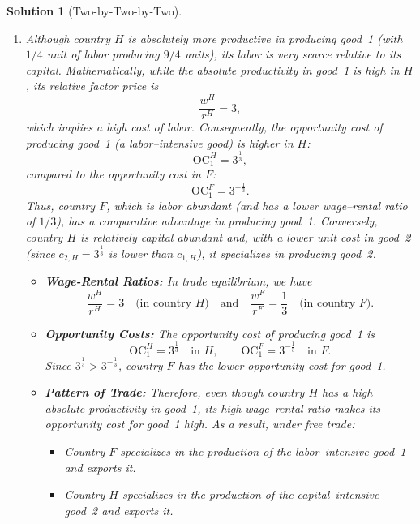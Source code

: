 \documentclass[a4paper,12pt]{article} %
\theoremstyle{nonitalic}
\newtheorem{solution}{Solution}
\begin{document}
\begin{solution}[Two-by-Two-by-Two]
\begin{enumerate}
        \item[7.] Although country $H$ is absolutely more productive in producing good~1 (with $1/4$ unit of labor producing $9/4$ units), its labor is very scarce relative to its capital. 
            Mathematically, while the \emph{absolute productivity} in good~1 is high in $H$, its \emph{relative factor price} is
            \[
            \frac{w^H}{r^H} = 3,
            \]
            which implies a high cost of labor. Consequently, the \emph{opportunity cost} of producing good~1 (a labor--intensive good) is higher in $H$:
            \[
            \text{OC}_1^H = 3^{\frac{1}{3}},
            \]
            compared to the opportunity cost in $F$:
            \[
            \text{OC}_1^F = 3^{-\frac{1}{3}}.
            \]
            Thus, country $F$, which is labor abundant (and has a lower wage–rental ratio of $1/3$), has a comparative advantage in producing good~1. Conversely, country $H$ is relatively capital abundant and, with a lower unit cost in good~2 (since $c_{2,H} = 3^{\frac{1}{3}}$ is lower than $c_{1,H}$), it specializes in producing good~2.
            \begin{itemize}
                \item \textbf{Wage-Rental Ratios:} In trade equilibrium, we have
                \[
                \frac{w^H}{r^H} = 3 \quad \text{(in country } H\text{)} \quad \text{and} \quad \frac{w^F}{r^F} = \frac{1}{3} \quad \text{(in country } F\text{)}.
                \]
                \item \textbf{Opportunity Costs:} The opportunity cost of producing good~1 is
                \[
                \text{OC}_1^H = 3^{\frac{1}{3}} \quad \text{in } H,\qquad \text{OC}_1^F = 3^{-\frac{1}{3}} \quad \text{in } F.
                \]
                Since $3^{\frac{1}{3}} > 3^{-\frac{1}{3}}$, country $F$ has the lower opportunity cost for good~1.
                \item \textbf{Pattern of Trade:} Therefore, even though country $H$ has a high absolute productivity in good~1, its high wage–rental ratio makes its opportunity cost for good~1 high. As a result, under free trade:
                \begin{itemize}
                    \item Country $F$ specializes in the production of the labor--intensive good~1 and exports it.
                    \item Country $H$ specializes in the production of the capital--intensive good~2 and exports it.
                \end{itemize}
            \end{itemize}            
    \end{enumerate}
\end{solution}
\end{document}
